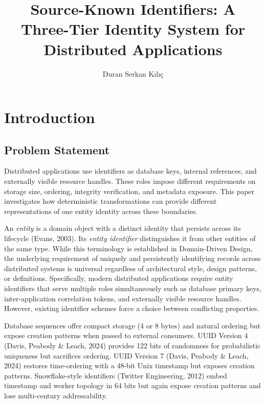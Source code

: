 \documentclass[fleqn,10pt]{wlpeerj}
\title{Source-Known Identifiers: A Three-Tier Identity System for
Distributed Applications}
\author[1]{Duran Serkan Kılıç}
\affil[1]{Independent Researcher, Ankara, Türkiye}
\begin{document}
\flushbottom
\maketitle
\thispagestyle{empty}

\raggedbottom

\newpage

\section{Introduction}\label{introduction}

\subsection{Problem Statement}\label{problem-statement}

Distributed applications use identifiers as database keys, internal
references, and externally visible resource handles. These roles impose
different requirements on storage size, ordering, integrity
verification, and metadata exposure. This paper investigates how
deterministic transformations can provide different representations of
one entity identity across these boundaries.

An \emph{entity} is a domain object with a distinct identity that
persists across its lifecycle (Evans, 2003). Its \emph{entity
identifier} distinguishes it from other entities of the same type. While
this terminology is established in Domain-Driven Design, the underlying
requirement of uniquely and persistently identifying records across
distributed systems is universal regardless of architectural style,
design patterns, or definitions. Specifically, modern distributed
applications require entity identifiers that serve multiple roles
simultaneously such as database primary keys, inter-application
correlation tokens, and externally visible resource handles. However,
existing identifier schemes force a choice between conflicting
properties.

Database sequences offer compact storage (4 or 8 bytes) and natural
ordering but expose creation patterns when passed to external consumers.
UUID Version 4 (Davis, Peabody \& Leach, 2024) provides 122 bits of
randomness for probabilistic uniqueness but sacrifices ordering. UUID
Version 7 (Davis, Peabody \& Leach, 2024) restores time-ordering with a
48-bit Unix timestamp but exposes creation patterns. Snowflake-style
identifiers (Twitter Engineering, 2012) embed timestamp and worker
topology in 64 bits but again expose creation patterns and lose
multi-century addressability.
\end{document}

